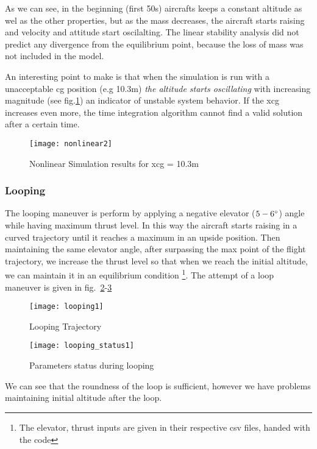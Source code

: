 As we can see, in the beginning (first 50s) aircrafts keeps a constant altitude
as wel as the other properties, but as the mass decreases, the aircraft starts
raising and velocity and attitude start oscilalting. The linear stability
analysis did not predict any divergence from the equilibrium point, because the
loss of mass was not included in the model.

An interesting point to make is that when the simulation is run with a
unacceptable cg position (e.g 10.3m) \textit{the altitude starts oscillating} with
increasing magnitude (see fig.\ref{fig:nonlinear2}) an indicator of unstable system behavior. If the xcg
increases even more, the time integration algorithm cannot find a valid solution
after a certain time.

\begin{figure}[H]
    \centering
    \texttt{[image: nonlinear2]}
    \caption{Nonlinear Simulation results for xcg = 10.3m}
    \label{fig:nonlinear2}
\end{figure}


\subsubsection{Looping}

The looping maneuver is perform by applying a negative elevator ($5-6\degree$) 
angle while having maximum thrust level. In this way the aircraft starts raising
in a curved trajectory until it reaches a maximum in an upside position. Then
maintaining the same elevator angle, after surpassing the max point of the
flight trajectory, we increase the thrust level so that when we reach the
initial altitude, we can maintain it in an equilibrium condition 
\footnote{The elevator, thrust inputs are given in their respective csv files,
handed with the code}. The attempt of a loop maneuver is given 
in fig.~\ref{fig:looping}-\ref{fig:looping_status}


\begin{figure}[H]
    \centering
    \texttt{[image: looping1]}
        \caption{Looping Trajectory}
        \label{fig:looping}
\end{figure}
\begin{figure}[H]
    \centering
    \texttt{[image: looping\_status1]}
    \caption{Parameters status during looping}
    \label{fig:looping_status}
\end{figure}

We can see that the roundness of the loop is sufficient, however we have
problems maintaining initial altitude after the loop.
